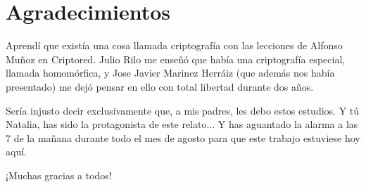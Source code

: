 \chapter*{Agradecimientos}
\label{chap:agradecimientos}

Aprendí que existía una cosa llamada criptografía con las lecciones de Alfonso Muñoz en Criptored. Julio Rilo me enseñó que había una criptografía especial, llamada homomórfica, y Jose Javier Marinez Herráiz (que además nos había presentado) me dejó pensar en ello con total libertad durante dos años.

Sería injusto decir exclusivamente que, a mis padres, les debo estos estudios. Y tú Natalia, has sido la protagonista de este relato... Y has aguantado la alarma a las 7 de la mañana durante todo el mes de agosto para que este trabajo estuviese hoy aquí.

¡Muchas gracias a todos!

